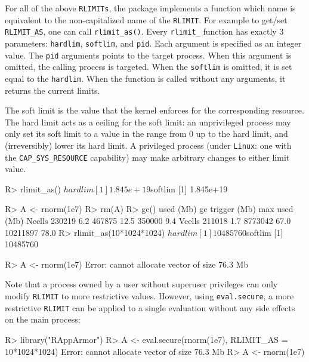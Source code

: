 \documentclass{jss}
\newcommand{\RAppArmor}{\pkg{RAppArmor}\xspace}
\newcommand{\Linux}{\texttt{Linux}\xspace}
\begin{document}
For all of the above \texttt{RLIMITs}, the \RAppArmor package implements a
function which name is equivalent to the non-capitalized name of the
\texttt{RLIMIT}. For example to get/set \texttt{RLIMIT\_AS}, one can call
\texttt{rlimit\_as()}. Every \texttt{rlimit\_} function has exactly 3 parameters:
\texttt{hardlim}, \texttt{softlim}, and \texttt{pid}. Each argument is
specified as an integer value. The \texttt{pid} arguments points to the target
process. When this argument is omitted, the calling process is targeted. When
the \texttt{softlim} is omitted, it is set equal to the \texttt{hardlim}.
When the function is called without any arguments, it returns the current limits.

The soft limit is the value that the kernel enforces for the corresponding
resource. The hard limit acts as a ceiling for the soft limit: an unprivileged
process may only set its soft limit to a value in the range from 0 up to the
hard limit, and (irreversibly) lower its hard limit. A  privileged process
(under  \Linux:  one  with  the \texttt{CAP\_SYS\_RESOURCE} capability) may make
arbitrary changes to either limit value.  \citep{linuxrlimit}

\begin{CodeChunk}
\begin{CodeInput}
R> rlimit_as()
$hardlim
[1] 1.845e+19

$softlim
[1] 1.845e+19

R> A <- rnorm(1e7)
R> rm(A)
R> gc()
         used (Mb) gc trigger (Mb) max used (Mb)
Ncells 230219  6.2     467875 12.5   350000  9.4
Vcells 211018  1.7    8773042 67.0 10211897 78.0
R> rlimit_as(10*1024*1024)
$hardlim
[1] 10485760

$softlim
[1] 10485760

R> A <- rnorm(1e7)
Error: cannot allocate vector of size 76.3 Mb
\end{CodeInput}
\end{CodeChunk}

Note that a process owned by a user without superuser privileges can only modify
\texttt{RLIMIT} to more restrictive values. However, using \texttt{eval.secure},
a more restrictive \texttt{RLIMIT} can be applied to a single evaluation without
any side effects on the main process:

\begin{CodeChunk}
\begin{CodeInput}
R> library("RAppArmor")
R> A <- eval.secure(rnorm(1e7), RLIMIT_AS = 10*1024*1024)
Error: cannot allocate vector of size 76.3 Mb
R> A <- rnorm(1e7)
\end{CodeInput}
\end{CodeChunk}
\end{document}
